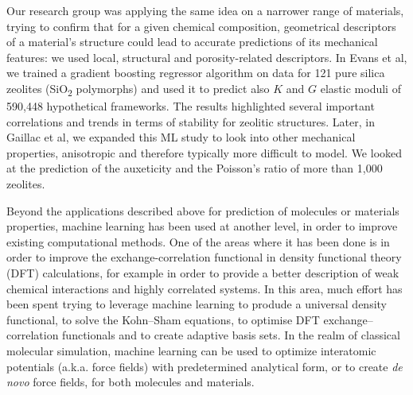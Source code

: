 \documentclass[aip,apm,amsmath,amssymb,reprint]{revtex4-2}
\begin{document}
Our research group was applying the same idea on a narrower range of materials, trying to confirm that for a given chemical composition, geometrical descriptors of a material's structure could lead to accurate predictions of its mechanical features: we used local, structural and porosity-related descriptors. In Evans et al,\cite{Evans2017} we trained a gradient boosting regressor algorithm on data for 121 pure silica zeolites\cite{Coudert2013} (SiO\textsubscript{2} polymorphs) and used it to predict also $K$ and $G$ elastic moduli of 590,448 hypothetical frameworks. The results highlighted several important correlations and trends in terms of stability for zeolitic structures. Later, in Gaillac et al, we expanded this ML study to look into other mechanical properties, anisotropic and therefore typically more difficult to model. We looked at the prediction of the auxeticity and the Poisson's ratio of more than 1,000 zeolites.\cite{Gaillac2020} 

Beyond the applications described above for prediction of molecules or materials properties, machine learning has been used at another level, in order to improve existing computational methods. One of the areas where it has been done is in order to improve the exchange-correlation functional in density functional theory (DFT) calculations, for example in order to provide a better description of weak chemical interactions and highly correlated systems. In this area, much effort has been spent trying to leverage machine learning to produde a universal density functional,\cite{Christensen2015, Snyder2012} to solve the Kohn--Sham equations,\cite{Brockherde2017} to optimise DFT exchange--correlation functionals\cite{Hollingsworth2018, Mardirossian2016} and to create adaptive basis sets.\cite{Schutt2018} In the realm of classical molecular simulation, machine learning can be used to optimize interatomic potentials (a.k.a. force fields) with predetermined analytical form,\cite{Li2017, Durholt2019} or to create \emph{de novo} force fields,\cite{Chmiela2017, Chmiela2018, Botu2016} for both molecules and materials. 
\end{document}
